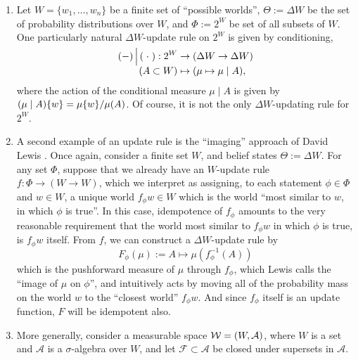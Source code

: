 \documentclass{article}
\begin{document}
\begin{enumerate}
    \item %
    Let $W = \{w_1, \ldots, w_n\}$ be a finite set of ``possible worlds'', 
    $\Theta := \Delta W$ be the set of probability distributions over $W$,
    and $\Phi := 2^W$ be set of all subsets of $W$.
    One particularly natural $\Delta W$-update rule on $2^W$ is given by conditioning,  
    \begin{align*}
        (-) \smash{\,\Big|\,} (\;\cdot\;) : 2^W &\to (\Delta W \to \Delta W) \\
        (A \subset W) &\mapsto (  \mu \mapsto \mu \mid A ),
    \end{align*}
    where the action of the conditional measure $\mu\mid A$ is given by $(\mu \mid A) \{w\} = {\mu\{w\}}/{\mu(A)}$. 
    Of course, it is not the only $\Delta W$-updating rule for $2^W$.
    
    \item 
    A second example of an update rule is the ``imaging'' approach of David Lewis
    \parencite{lewis1976probabilities}.
    Once again, consider a finite set $W$, and belief states $\Theta := \Delta W$.
    For any set $\Phi$, suppose that we already have an $W$-update rule 
    $f : \Phi \to (W \to W)$, which we interpret as assigning, to each statement $\phi \in \Phi$ and $w \in W$, a unique world $f_\phi w \in W$ which is the world ``most similar to $w$, in which $\phi$ is true''.
    In this case, idempotence of $f_\phi$ amounts to the very reasonable requirement that the world most similar to $f_\phi w$ in which $\phi$ is true, is $f_\phi w$ itself.
    From $f$, we can construct a $\Delta W$-update rule by
    \[ 
        F_\phi(\mu) :=  A \mapsto \mu( f^{-1}_\phi( A ))
    \] 
    which is the pushforward measure of $\mu$ through $f_\phi$, which Lewis calls the ``image of $\mu$ on $\phi$'', and intuitively acts by moving all of the probability mass on the world $w$ to the ``closest world'' $f_\phi w$. And since $f_\phi$ itself is an update function, $F$ will be idempotent also. 
    
    \item More generally, consider a measurable space $\mathcal W = (W, \mathcal A)$, where $W$ is a set and $\mathcal A$ is a $\sigma$-algebra over $W$, and let $\mathcal F \subset \mathcal A$ be closed under supersets in $\mathcal A$.
    

\end{enumerate}
\end{document}
